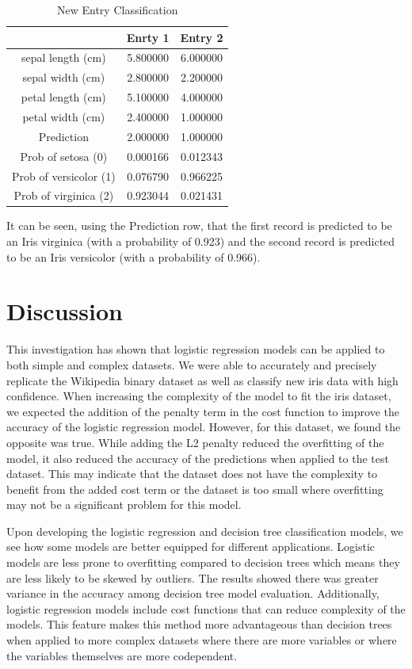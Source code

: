 \documentclass[journal]{IEEEtran}
\begin{document}
\begin{table}[h!]
\centering
\begin{tabular}{ c | c c }
 & Enrty 1 &	Entry 2 \\ 
\hline
sepal length (cm)	& 5.800000	& 6.000000 \\
sepal width (cm)	& 2.800000	& 2.200000 \\
petal length (cm)	& 5.100000	& 4.000000 \\
petal width (cm)	& 2.400000	& 1.000000 \\
Prediction	& 2.000000	& 1.000000 \\
Prob of setosa (0)	& 0.000166	& 0.012343 \\
Prob of versicolor (1)	& 0.076790	& 0.966225 \\
Prob of virginica (2)	& 0.923044	& 0.021431
\end{tabular}
\caption{New Entry Classification}
\label{table:new-entry-table}
\end{table}

It can be seen, using the Prediction row, that the first record is predicted to be an Iris virginica (with a probability of 0.923) and the second record is predicted to be an Iris versicolor (with a probability of 0.966).

\section{Discussion}

This investigation has shown that logistic regression models can be applied to both simple and complex datasets. We were able to accurately and precisely replicate the Wikipedia binary dataset as well as classify new iris data with high confidence. When increasing the complexity of the model to fit the iris dataset, we expected the addition of the penalty term in the cost function to improve the accuracy of the logistic regression model. However, for this dataset, we found the opposite was true. While adding the L2 penalty reduced the overfitting of the model, it also reduced the accuracy of the predictions when applied to the test dataset. This may indicate that the dataset does not have the complexity to benefit from the added cost term or the dataset is too small where overfitting may not be a significant problem for this model. 

Upon developing the logistic regression and decision tree classification models, we see how some models are better equipped for different applications. Logistic models are less prone to overfitting compared to decision trees which means they are less likely to be skewed by outliers. The results showed there was greater variance in the accuracy among decision tree model evaluation. Additionally, logistic regression models include cost functions that can reduce complexity of the models. This feature makes this method more advantageous than decision trees when applied to more complex datasets where there are more variables or where the variables themselves are more codependent. 
\end{document}
